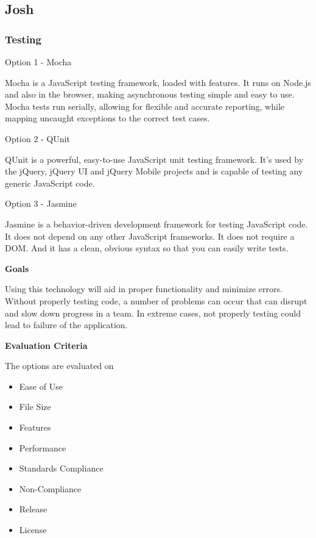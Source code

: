 \documentclass[letterpaper, 10pt, draftclsnofoot, compsoc, onecolumn]{IEEEtran}
\begin{document}
{%
\newpage
\subsection{Josh}
\vspace{1pc}

\subsubsection{Testing}
{\noindent \par}

{\noindent Option 1 - Mocha \par}
{\noindent Mocha is a JavaScript testing framework, loaded with features. It runs on Node.js and also in the browser, making asynchronous testing simple and easy to use. Mocha tests run serially, allowing for flexible and accurate reporting, while mapping uncaught exceptions to the correct test cases. \cite{Mocha} \par}

\medskip
{\noindent Option 2 - QUnit \par}
{\noindent QUnit is a powerful, easy-to-use JavaScript unit testing framework. It's used by the jQuery, jQuery UI and jQuery Mobile projects and is capable of testing any generic JavaScript code. \cite{QUnit}  \par}

\medskip
{\noindent Option 3 - Jasmine \par}
{\noindent Jasmine is a behavior-driven development framework for testing JavaScript code. It does not depend on any other JavaScript frameworks. It does not require a DOM. And it has a clean, obvious syntax so that you can easily write tests. \cite{Jasmine}  \par}

\medskip
{\noindent\rmfamily\bfseries\color{black} Goals \par}
{\noindent Using this technology will aid in proper functionality and minimize errors. Without properly testing code, a number of problems can occur that can disrupt and slow down progress in a team. In extreme cases, not properly testing could lead to failure of the application. \par}

\medskip
\newpage
{\noindent\rmfamily\bfseries\color{black} Evaluation Criteria \par}
{\noindent The options are evaluated on 

\begin{itemize}
\item Ease of Use
\item File Size
\item Features
\item Performance
\item Standards Compliance
\item Non-Compliance
\item Release 
\item License
\end{itemize}

}}
\end{document}
